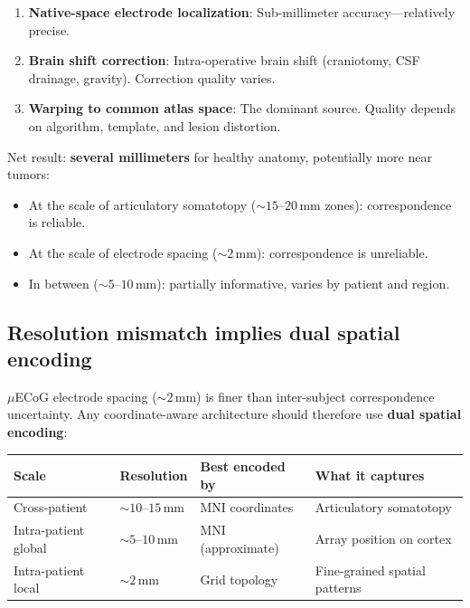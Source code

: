 \documentclass[11pt,letterpaper]{article}
\begin{document}
\begin{enumerate}[leftmargin=2em]
\item \textbf{Native-space electrode localization}: Sub-millimeter accuracy---relatively precise.
\item \textbf{Brain shift correction}: Intra-operative brain shift (craniotomy, CSF drainage, gravity). Correction quality varies.
\item \textbf{Warping to common atlas space}: The dominant source. Quality depends on algorithm, template, and lesion distortion.
\end{enumerate}

Net result: \textbf{several millimeters} for healthy anatomy, potentially more near tumors:
\begin{itemize}[leftmargin=2em]
\item At the scale of articulatory somatotopy (${\sim}15$--$20$\,mm zones): correspondence is reliable.
\item At the scale of electrode spacing (${\sim}2$\,mm): correspondence is unreliable.
\item In between (${\sim}5$--$10$\,mm): partially informative, varies by patient and region.
\end{itemize}

\subsection{Resolution mismatch implies dual spatial encoding}

$\mu$ECoG electrode spacing (${\sim}2$\,mm) is finer than inter-subject correspondence uncertainty. Any coordinate-aware architecture should therefore use \textbf{dual spatial encoding}:

\begin{table}[h]
\centering\small
\begin{tabular}{@{}llll@{}}
\toprule
\textbf{Scale} & \textbf{Resolution} & \textbf{Best encoded by} & \textbf{What it captures} \\
\midrule
Cross-patient & ${\sim}10$--$15$\,mm & MNI coordinates & Articulatory somatotopy \\
Intra-patient global & ${\sim}5$--$10$\,mm & MNI (approximate) & Array position on cortex \\
Intra-patient local & ${\sim}2$\,mm & Grid topology & Fine-grained spatial patterns \\
\bottomrule
\end{tabular}
\end{table}
\end{document}
